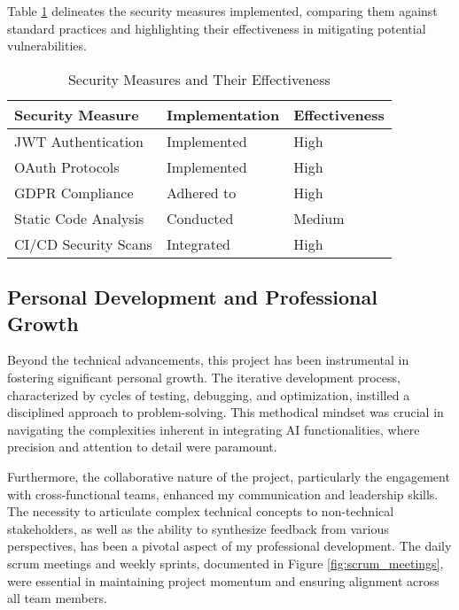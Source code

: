 Table \ref{tab:security_measures} delineates the security measures implemented, comparing them against standard practices and highlighting their effectiveness in mitigating potential vulnerabilities.

\begin{table}[ht]
    \centering
    \begin{tabular}{|l|l|l|}
        \hline
        \textbf{Security Measure} & \textbf{Implementation} & \textbf{Effectiveness} \\ \hline
        JWT Authentication & Implemented & High \\ \hline
        OAuth Protocols & Implemented & High \\ \hline
        GDPR Compliance & Adhered to & High \\ \hline
        Static Code Analysis & Conducted & Medium \\ \hline
        CI/CD Security Scans & Integrated & High \\ \hline
    \end{tabular}
    \caption{Security Measures and Their Effectiveness}
    \label{tab:security_measures}
\end{table}

\subsection{Personal Development and Professional Growth}
Beyond the technical advancements, this project has been instrumental in fostering significant personal growth. The iterative development process, characterized by cycles of testing, debugging, and optimization, instilled a disciplined approach to problem-solving. This methodical mindset was crucial in navigating the complexities inherent in integrating \gls{AI} functionalities, where precision and attention to detail were paramount.

Furthermore, the collaborative nature of the project, particularly the engagement with cross-functional teams, enhanced my communication and leadership skills. The necessity to articulate complex technical concepts to non-technical stakeholders, as well as the ability to synthesize feedback from various perspectives, has been a pivotal aspect of my professional development. The daily scrum meetings and weekly sprints, documented in Figure \ref{fig:scrum_meetings}, were essential in maintaining project momentum and ensuring alignment across all team members.


